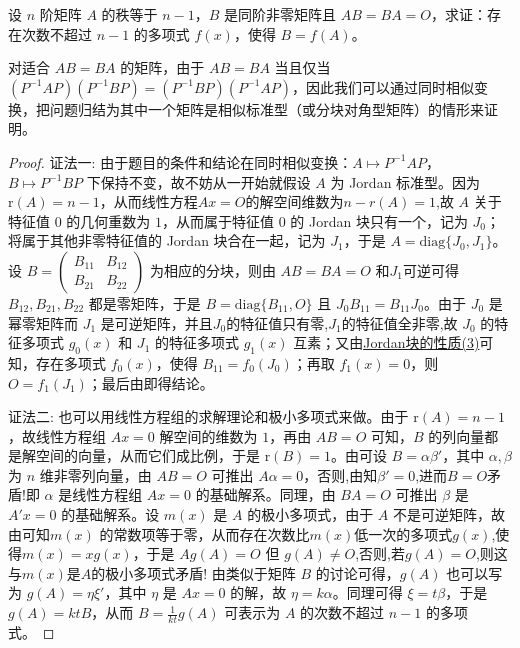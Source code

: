 \documentclass[../../main.tex]{subfiles}%
\begin{document}
\begin{proposition}\label{proposition:与秩为n-1的矩阵乘法可交换的矩阵也可被其多项式表示}
设 $n$ 阶矩阵 $A$ 的秩等于 $n - 1$，$B$ 是同阶非零矩阵且 $AB = BA = O$，求证：存在次数不超过 $n - 1$ 的多项式 $f(x)$，使得 $B = f(A)$。
\end{proposition}
\begin{remark}
对适合 $AB = BA$ 的矩阵，由于 $AB = BA$ 当且仅当 $(P^{-1}AP)(P^{-1}BP)=(P^{-1}BP)(P^{-1}AP)$，因此我们可以通过同时相似变换，把问题归结为其中一个矩阵是相似标准型（或分块对角型矩阵）的情形来证明。
\end{remark}
\begin{proof}

{\color{blue}证法一:}
由于题目的条件和结论在同时相似变换：$A\mapsto P^{-1}AP$，$B\mapsto P^{-1}BP$ 下保持不变，故不妨从一开始就假设 $A$ 为 Jordan 标准型。因为 $\mathrm{r}(A)=n - 1$，从而线性方程$Ax=O$的解空间维数为$n-r(A)=1$,故 $A$ 关于特征值 $0$ 的几何重数为 $1$，从而属于特征值 $0$ 的 Jordan 块只有一个，记为 $J_0$；将属于其他非零特征值的 Jordan 块合在一起，记为 $J_1$，于是 $A = \mathrm{diag}\{J_0,J_1\}$。设 $B=\begin{pmatrix}
B_{11} & B_{12} \\
B_{21} & B_{22}
\end{pmatrix}$ 为相应的分块，则由 $AB = BA = O$ 和$J_1$可逆可得 $B_{12},B_{21},B_{22}$ 都是零矩阵，于是 $B = \mathrm{diag}\{B_{11},O\}$ 且 $J_0B_{11}=B_{11}J_0$。由于 $J_0$ 是幂零矩阵而 $J_1$ 是可逆矩阵，并且$J_0$的特征值只有零,$J_1$的特征值全非零,故 $J_0$ 的特征多项式 $g_0(x)$ 和 $J_1$ 的特征多项式 $g_1(x)$ 互素；又由\hyperref[proposition:Jordan块的性质]{Jordan块的性质(3)}可知，存在多项式 $f_0(x)$，使得 $B_{11}=f_0(J_0)$；再取 $f_1(x)=0$，则 $O = f_1(J_1)$；最后由即得结论。

{\color{blue}证法二:}
也可以用线性方程组的求解理论和极小多项式来做。由于 $\mathrm{r}(A)=n - 1$，故线性方程组 $Ax = 0$ 解空间的维数为 $1$，再由 $AB = O$ 可知，$B$ 的列向量都是解空间的向量，从而它们成比例，于是 $\mathrm{r}(B)=1$。由可设 $B = \alpha\beta'$，其中 $\alpha,\beta$ 为 $n$ 维非零列向量，由 $AB = O$ 可推出 $A\alpha = 0$，否则,由知$\beta'=0$,进而$B=O$矛盾!即 $\alpha$ 是线性方程组 $Ax = 0$ 的基础解系。同理，由 $BA = O$ 可推出 $\beta$ 是 $A'x = 0$ 的基础解系。设 $m(x)$ 是 $A$ 的极小多项式，由于 $A$ 不是可逆矩阵，故由可知$m(x)$ 的常数项等于零，从而存在次数比$m(x)$低一次的多项式$g(x)$,使得$m(x)=xg(x)$，于是 $Ag(A)=O$ 但 $g(A)\neq O$,否则,若$g(A)=O$,则这与$m(x)$是$A$的极小多项式矛盾! 由类似于矩阵 $B$ 的讨论可得，$g(A)$ 也可以写为 $g(A)=\eta\xi'$，其中 $\eta$ 是 $Ax = 0$ 的解，故 $\eta = k\alpha$。同理可得 $\xi = t\beta$，于是 $g(A)=ktB$，从而 $B = \frac{1}{kt}g(A)$ 可表示为 $A$ 的次数不超过 $n - 1$ 的多项式。
\end{proof}
\end{document}
